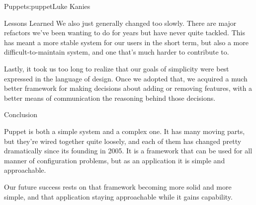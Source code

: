 \begin{aosachapter}{Puppet}{s:puppet}{Luke Kanies}
\begin{aosasect1}{Lessons Learned}
We also just generally changed too slowly.  There are major refactors
we've been wanting to do for years but have never quite tackled.  This
has meant a more stable system for our users in the short term, but
also a more difficult-to-maintain system, and one that's much harder
to contribute to.

Lastly, it took us too long to realize that our goals of simplicity
were best expressed in the language of design.  Once we adopted that,
we acquired a much better framework for making decisions about adding
or removing features, with a better means of communication the
reasoning behind those decisions.

\end{aosasect1}

\begin{aosasect1}{Conclusion}

Puppet is both a simple system and a complex one.  It has many moving
parts, but they're wired together quite loosely, and each of them has
changed pretty dramatically since its founding in 2005.  It is a
framework that can be used for all manner of configuration problems,
but as an application it is simple and approachable.

Our future success rests on that framework becoming more solid and
more simple, and that application staying approachable while it gains
capability.

\end{aosasect1}

\end{aosachapter}

